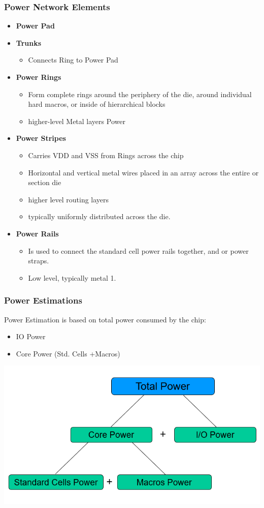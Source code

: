 \documentclass[compress]{beamer}
\begin{document}
\begin{frame}
	\frametitle{Power Network Elements }
	\begin{itemize}
		\item \textbf{Power Pad} 
		\item \textbf{Trunks}
			\begin{itemize}
				\item Connects Ring to Power Pad
			\end{itemize}
		\item \textbf{Power Rings}
			\begin{itemize}
				\item Form complete rings around the periphery of the die, around individual hard macros, or inside of hierarchical blocks
				\item higher-level Metal layers Power
			\end{itemize}			
		\item \textbf{Power Stripes}
			\begin{itemize}
				\item Carries VDD and VSS from Rings across the chip
				\item Horizontal and vertical metal wires placed in an array across the entire or section die
				\item higher level routing layers \item typically uniformly distributed across the die.
			\end{itemize}
		\item \textbf{Power Rails}
			\begin{itemize}
				\item Is used to connect the standard cell power rails together, and or power straps.
				\item Low level, typically metal 1.
			\end{itemize}
	\end{itemize}
\end{frame}

\begin{frame}
	\frametitle{Power Estimations}
	Power Estimation is based on total power consumed by the chip:
		\begin{itemize}
			\item IO Power
			\item Core Power (Std. Cells +Macros)
		\end{itemize}
		\begin{center}
			\includegraphics[width=\textwidth]{power2}
		\end{center}
\end{frame}
\end{document}
